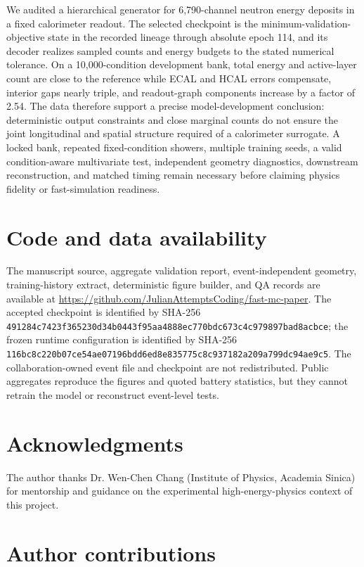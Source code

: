 \documentclass[11pt]{article}
\begin{document}
We audited a hierarchical generator for 6,790-channel neutron energy deposits in a fixed calorimeter readout. The selected checkpoint is the minimum-validation-objective state in the recorded lineage through absolute epoch 114, and its decoder realizes sampled counts and energy budgets to the stated numerical tolerance. On a 10,000-condition development bank, total energy and active-layer count are close to the reference while ECAL and HCAL errors compensate, interior gaps nearly triple, and readout-graph components increase by a factor of 2.54. The data therefore support a precise model-development conclusion: deterministic output constraints and close marginal counts do not ensure the joint longitudinal and spatial structure required of a calorimeter surrogate. A locked bank, repeated fixed-condition showers, multiple training seeds, a valid condition-aware multivariate test, independent geometry diagnostics, downstream reconstruction, and matched timing remain necessary before claiming physics fidelity or fast-simulation readiness.

\section*{Code and data availability}

The manuscript source, aggregate validation report, event-independent geometry, training-history extract, deterministic figure builder, and QA records are available at \url{https://github.com/JulianAttemptsCoding/fast-mc-paper}. The accepted checkpoint is identified by SHA-256 \nolinkurl{491284c7423f365230d34b0443f95aa4888ec770bdc673c4c979897bad8acbce}; the frozen runtime configuration is identified by SHA-256 \nolinkurl{116bc8c220b07ce54ae07196bdd6ed8e835775c8c937182a209a799dc94ae9c5}. The collaboration-owned event file and checkpoint are not redistributed. Public aggregates reproduce the figures and quoted battery statistics, but they cannot retrain the model or reconstruct event-level tests.

\section*{Acknowledgments}

The author thanks Dr. Wen-Chen Chang (Institute of Physics, Academia Sinica) for mentorship and guidance on the experimental high-energy-physics context of this project.

\section*{Author contributions}
\end{document}
